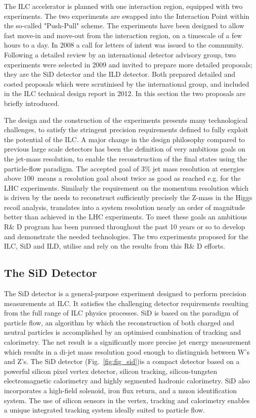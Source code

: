 The ILC accelerator is planned with one interaction region, equipped with two experiments. The two experiments are swapped into the Interaction Point within the so-called "Push-Pull" scheme. The experiments have been designed to allow fast move-in and move-out from the interaction region, on a timescale of a few hours to a day. In 2008 a call for letters of intent was issued to the community. Following a detailed review by an international detector advisory group, two experiments were selected in 2009 and invited to prepare more detailed proposals; they are the SiD detector and the ILD detector. Both prepared detailed and costed proposals which were scrutinised by the international group, and included in the ILC technical design report in 2012. In this section the two proposals are briefly introduced.

The design and the construction of the experiments presents many technological challenges, to satisfy the stringent precision requirements defined to fully exploit the potential of the ILC. A major change in the design philosophy compared to previous large scale detectors has been the definition of very ambitious goals on the jet-mass resolution, to enable the reconstruction of the final states using the particle-flow paradigm. The accepted goal of $3\%$ jet mass resolution at energies above 100~\GeV means a resolution goal about twice as good as reached e.g. for the LHC experiments. Similarly the requirement on the momentum resolution which is driven by the needs to reconstruct sufficiently precisely the Z-mass in the Higgs recoil analysis, translates into a system resolution nearly an order of magnitude better than achieved in the LHC experiments. To meet these goals an ambitious R\& D program has been pursued throughout the past 10 years or so to develop and demonstrate the needed technologies. The two experiments proposed for the ILC, SiD and ILD, utilise and rely on the results from this R\& D efforts. 

\subsection{The SiD Detector}
The SiD detector is a general-purpose experiment designed to perform precision measurements
at ILC. It satisfies the challenging detector requirements resulting from the full range of ILC physics processes. SiD is based on the paradigm of particle flow, an algorithm by which
the reconstruction of both charged and neutral particles is accomplished by an optimised
combination of tracking and calorimetry. The net result is a significantly more precise jet
energy measurement which results in a di-jet mass resolution good enough to distinguish
between W’s and Z’s.
The SiD detector (Fig.~\ref{fig:fig_sid})is a compact detector based on a powerful silicon
pixel vertex detector, silicon tracking, silicon-tungsten electromagnetic calorimetry and
highly segmented hadronic calorimetry. 
SiD also incorporates a high-field solenoid, iron
flux return, and a muon identification system. The use of silicon sensors in the vertex, tracking
and calorimetry enables a unique integrated tracking system ideally suited to particle
flow.

